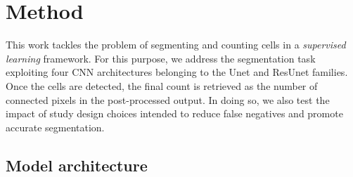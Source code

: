 \chapter{Method}
\label{chap:partII_method}

This work tackles the problem of segmenting and counting cells in a \textit{supervised learning} framework. For this purpose, we address the segmentation task exploiting four CNN architectures belonging to the Unet and ResUnet families. 
Once the cells are detected, the final count is retrieved as the number of connected pixels in the post-processed output.
In doing so, we also test the impact of study design choices intended to reduce false negatives and promote accurate segmentation.

\section{Model architecture}
\label{model_architecture}

